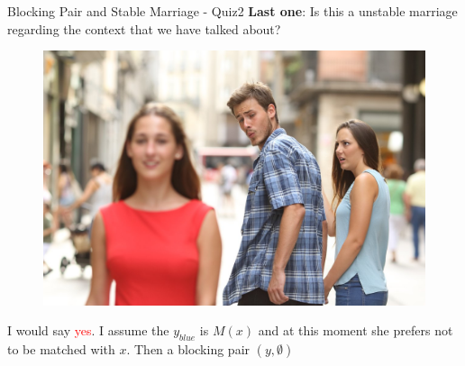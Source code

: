 \documentclass{beamer}
\begin{document}
{
\begin{frame}{Blocking Pair and Stable Marriage - Quiz2}
	\textbf{Last one}: Is this a unstable marriage regarding the context that we have talked about?
\begin{center}
	\begin{figure}
		\includegraphics[width=.3\textwidth]{distracted_boyfriend.jpg}
	\end{figure}
	\pause
	I would say \textcolor{red}{yes}. 
	I assume the $y_{blue}$ is $M(x)$ and at this moment she prefers not to be matched with $x$. Then a blocking pair $(y, \emptyset)$
\end{center}
\end{frame}
}

\end{document}
